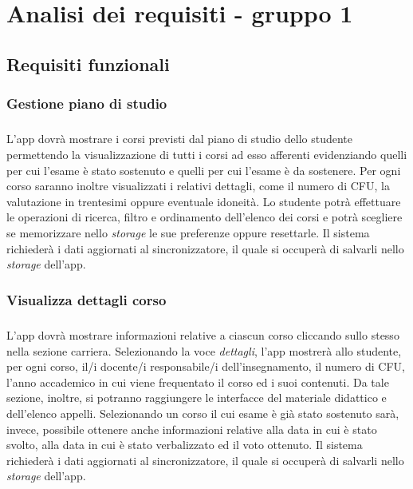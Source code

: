 
\chapter{Analisi dei requisiti - gruppo 1}
\label{ref:requisiti1}


\section{Requisiti funzionali}

\subsection{Gestione piano di studio}
\paragraph{} 
L’app dovrà mostrare i corsi previsti dal piano di studio dello studente permettendo la visualizzazione di tutti i corsi ad esso afferenti evidenziando quelli per cui l’esame è stato sostenuto e quelli per cui l’esame è da sostenere. Per ogni corso saranno inoltre visualizzati i relativi dettagli, come il numero di CFU, la valutazione in trentesimi oppure eventuale idoneità. Lo studente potrà effettuare le operazioni di ricerca, filtro e ordinamento dell'elenco dei corsi e potrà scegliere se memorizzare nello \textit{storage} le sue preferenze oppure resettarle. Il sistema richiederà i dati aggiornati al sincronizzatore, il quale si occuperà di salvarli nello \textit{storage} dell’app.
\subsection{Visualizza dettagli corso}
\paragraph{} 
L’app dovrà mostrare informazioni relative a ciascun corso cliccando sullo stesso nella sezione carriera. Selezionando la voce \textit{dettagli}, l’app mostrerà allo studente, per ogni corso, il/i docente/i responsabile/i dell’insegnamento, il numero di CFU, l’anno accademico in cui viene frequentato il corso ed i suoi contenuti. Da tale sezione, inoltre, si potranno raggiungere le interfacce del materiale didattico e dell’elenco appelli. Selezionando un corso il cui esame è già stato sostenuto sarà, invece, possibile ottenere anche informazioni relative alla data in cui è stato svolto, alla data in cui è stato verbalizzato ed il voto ottenuto. Il sistema richiederà i dati aggiornati al sincronizzatore, il quale si occuperà di salvarli nello \textit{storage} dell’app.
